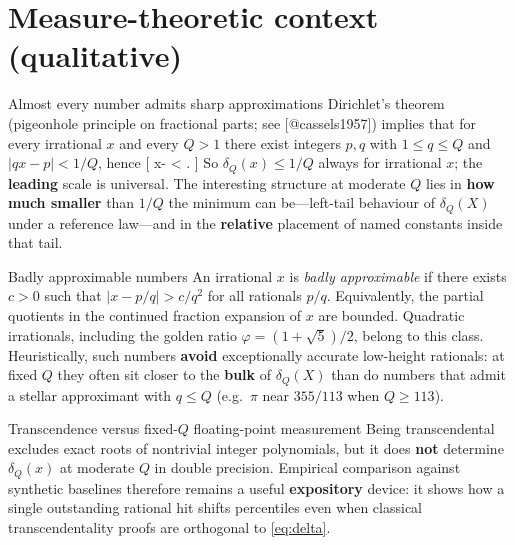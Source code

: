 \documentclass[
  ignorenonframetext,
]{beamer}
\author{\texorpdfstring{}{}}
\date{}
\begin{document}
\section{Measure-theoretic context
(qualitative)}\label{measure-theoretic-context-qualitative}

\begin{frame}{Almost every number admits sharp approximations}
\protect{}\label{almost-every-number-admits-sharp-approximations}
Dirichlet's theorem (pigeonhole principle on fractional parts; see
{[}@cassels1957{]}) implies that for every irrational \(x\) and every
\(Q>1\) there exist integers \(p,q\) with \(1 \leq q \leq Q\) and
\(|qx-p|<1/Q\), hence {[} \left\textbar x-\right\textbar{}
\textless{}  \leq {}. {]} So
\(\delta_Q(x) \leq 1/Q\) always for irrational \(x\); the
\textbf{leading} scale is universal. The interesting structure at
moderate \(Q\) lies in \textbf{how much smaller} than \(1/Q\) the
minimum can be---left-tail behaviour of \(\delta_Q(X)\) under a
reference law---and in the \textbf{relative} placement of named
constants inside that tail.
\end{frame}

\begin{frame}{Badly approximable numbers}
\protect{}\label{badly-approximable-numbers}
An irrational \(x\) is \emph{badly approximable} if there exists \(c>0\)
such that \(|x-p/q|>c/q^2\) for all rationals \(p/q\). Equivalently, the
partial quotients in the continued fraction expansion of \(x\) are
bounded. Quadratic irrationals, including the golden ratio
\(\varphi=(1+\sqrt{5})/2\), belong to this class. Heuristically, such
numbers \textbf{avoid} exceptionally accurate low-height rationals: at
fixed \(Q\) they often sit closer to the \textbf{bulk} of
\(\delta_Q(X)\) than do numbers that admit a stellar approximant with
\(q\leq Q\) (e.g.~\(\pi\) near \(355/113\) when \(Q\ge 113\)).
\end{frame}

\begin{frame}{Transcendence versus fixed-\(Q\) floating-point
measurement}
\protect{}\label{transcendence-versus-fixed-q-floating-point-measurement}
Being transcendental excludes exact roots of nontrivial integer
polynomials, but it does \textbf{not} determine \(\delta_Q(x)\) at
moderate \(Q\) in double precision. Empirical comparison against
synthetic baselines therefore remains a useful \textbf{expository}
device: it shows how a single outstanding rational hit shifts
percentiles even when classical transcendentality proofs are orthogonal
to \eqref{eq:delta}.
\end{frame}
\end{document}

